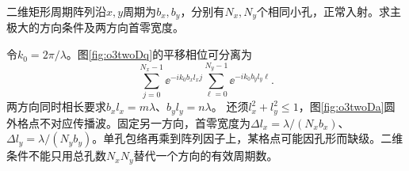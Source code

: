 \begin{example}\label{ex:o3twoDgrating}
二维矩形周期阵列沿$x,y$周期为$b_x,b_y$，分别有$N_x,N_y$个相同小孔，正常入射。求主极大的方向条件及两方向首零宽度。
\end{example}
\begin{solution}
令$k_0=2\pi/\lambda$。图\ref{fig:o3twoDq}的平移相位可分离为
\[
 \sum_{j=0}^{N_x-1}\ee^{-ik_0b_xl_xj}
 \sum_{\ell=0}^{N_y-1}\ee^{-ik_0b_yl_y\ell}.
\]
两方向同时相长要求$b_xl_x=m\lambda$、$b_yl_y=n\lambda$。
还须$l_x^2+l_y^2\leq1$，图\ref{fig:o3twoDa}圆外格点不对应传播波。固定另一方向，首零宽度为$\Delta l_x=\lambda/(N_xb_x)$、$\Delta l_y=\lambda/(N_yb_y)$。单孔包络再乘到阵列因子上，某格点可能因孔形而缺级。二维条件不能只用总孔数$N_xN_y$替代一个方向的有效周期数。
\end{solution}

